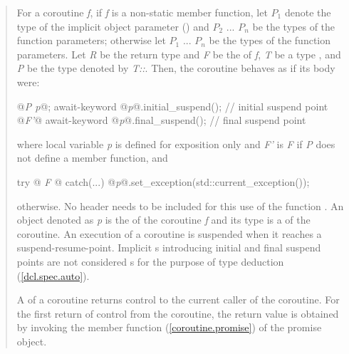 \begin{quote}
\pnum
For a coroutine \textit{f}, if 
\textit{f} is a non-static member function, let $P_1$ denote the type of the implicit object parameter () and $P_2$ ... $P_n$ be the types of the function parameters; otherwise let $P_1$ ... $P_n$ be the types of the function parameters.
Let \textit{R} be the return type and \textit{F} be the 
of \textit{f}, \textit{T} be a type , and \textit{P} be the type denoted by \textit{T::}. 
Then, the coroutine behaves as if its body were:
\begin{codeblock}
  {
     @\textit{P p}@;
     await-keyword @\textit{p}@.initial_suspend(); // initial suspend point
     @\textit{F'}@
     await-keyword @\textit{p}@.final_suspend(); // final suspend point
  }
\end{codeblock}
where local variable \textit{p} is 
defined for
exposition only and
\textit{F'} is \textit{F}
if \textit{P} does not define a  member function, 
and 
\begin{codeblock}
  try {@\textit{ F }@} catch(...) { @\textit{p}@.set_exception(std::current_exception()); }
\end{codeblock}

otherwise. 
No header needs to be included for this use of the function .
An object denoted as \textit{p} is the  of
the coroutine \textit{f} and its type is a 
of the coroutine.
An execution of a coroutine is suspended when it reaches a suspend-resume-point. Implicit s introducing initial and final suspend points are not considered s for the purpose of type deduction (\ref{dcl.spec.auto}). 

\pnum 
A  of a coroutine returns control to the current
caller of the coroutine. For the first return of control from the coroutine, the return value is obtained by invoking the member function 
 (\ref{coroutine.promise})
of the promise object.



\end{quote}
